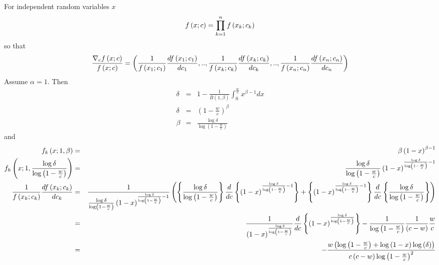 \documentclass{article}
\begin{document}
For independent random variables $x$%
\[
f\left( x;c\right) =\mathop{\displaystyle \prod }\limits_{k=1}^{n}f\left( x_{k};c_{k}\right) 
\]%
so that%
\[
\frac{\nabla _{c}f\left( x;c\right) }{f\left( x;c\right) }=\left( \frac{1}{%
f\left( x_{1};c_{1}\right) }\frac{df\left( x_{1};c_{1}\right) }{dc_{1}},..,%
\frac{1}{f\left( x_{k};c_{k}\right) }\frac{df\left( x_{k};c_{k}\right) }{%
dc_{k}},..,\frac{1}{f\left( x_{n};c_{n}\right) }\frac{df\left(
x_{n};c_{n}\right) }{dc_{n}}\right) 
\]%
Assume $\alpha =1$. Then%
\begin{eqnarray*}
\delta  &=&1-\frac{1}{B\left( 1,\beta \right) }\int_{0}^{\frac{w}{c}%
}x^{\beta -1}dx \\
\delta  &=&\left( 1-\frac{w}{c}\right) ^{\beta } \\
\beta  &=&\frac{\log \delta }{\log \left( 1-\frac{w}{c}\right) }
\end{eqnarray*}%
and%
\begin{eqnarray*}
f_{k}\left( x;1,\beta \right)  &=&\beta \left( 1-x\right) ^{\beta -1} \\
f_{k}\left( x;1,\frac{\log \delta }{\log \left( 1-\frac{w}{c}\right) }%
\right)  &=&\frac{\log \delta }{\log \left( 1-\frac{w}{c}\right) }\left(
1-x\right) ^{\frac{\log \delta }{\log \left( 1-\frac{w}{c}\right) }-1} \\
\frac{1}{f\left( x_{k};c_{k}\right) }\frac{df\left( x_{k};c_{k}\right) }{%
dc_{k}} &=&\frac{1}{\frac{\log \delta }{\log \left( 1-\frac{w}{c}\right) }%
\left( 1-x\right) ^{\frac{\log \delta }{\log \left( 1-\frac{w}{c}\right) }-1}%
}\left( \left\{ \frac{\log \delta }{\log \left( 1-\frac{w}{c}\right) }%
\right\} \frac{d}{dc}\left\{ \left( 1-x\right) ^{\frac{\log \delta }{\log
\left( 1-\frac{w}{c}\right) }-1}\right\} +\left\{ \left( 1-x\right) ^{\frac{%
\log \delta }{\log \left( 1-\frac{w}{c}\right) }-1}\right\} \frac{d}{dc}%
\left\{ \frac{\log \delta }{\log \left( 1-\frac{w}{c}\right) }\right\}
\right)  \\
&=&\frac{1}{\left( 1-x\right) ^{\frac{\log \delta }{\log \left( 1-\frac{w}{c}%
\right) }}}\frac{d}{dc}\left\{ \left( 1-x\right) ^{\frac{\log \delta }{\log
\left( 1-\frac{w}{c}\right) }}\right\} -\frac{1}{\log \left( 1-\frac{w}{c}%
\right) }\frac{1}{\left( c-w\right) }\frac{w}{c} \\
&=&-\frac{w\left( \log \left( 1-\frac{w}{c}\right) +\log \left( 1-x\right)
\log \left( \delta \right) \right) }{c\left( c-w\right) \log \left( 1-\frac{w%
}{c}\right) ^{2}}
\end{eqnarray*}
\end{document}
